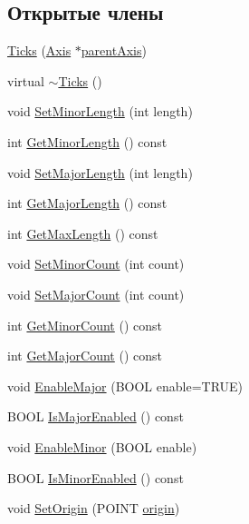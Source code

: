 \subsection*{Открытые члены}
\begin{DoxyCompactItemize}
\item 
\hyperlink{class_ticks_a48820608dd7a0bd504527deb457fc111}{Ticks} (\hyperlink{class_axis}{Axis} $\ast$\hyperlink{class_ticks_a1651670c18ed9ab64dc36f1a0f97f6c6}{parent\-Axis})
\item 
virtual \hyperlink{class_ticks_ab3a97a6266de2e1d089fbd85cbe5f5dd}{$\sim$\-Ticks} ()
\item 
void \hyperlink{class_ticks_a2fb7a8c3fe17f9a768014f9b7a6ab2e4}{Set\-Minor\-Length} (int length)
\item 
int \hyperlink{class_ticks_ad6394a3241855a227cfd869a8d676374}{Get\-Minor\-Length} () const 
\item 
void \hyperlink{class_ticks_acf24cc03f24d121992d8972e4dc703f9}{Set\-Major\-Length} (int length)
\item 
int \hyperlink{class_ticks_a1d03d0c25f828870ebfabfc536e9becb}{Get\-Major\-Length} () const 
\item 
int \hyperlink{class_ticks_ae0d548cd2a8dcc2feed13bb17800a038}{Get\-Max\-Length} () const 
\item 
void \hyperlink{class_ticks_a483d4d8347a6753c12960c95729821dc}{Set\-Minor\-Count} (int count)
\item 
void \hyperlink{class_ticks_ad79d9186b5b9f2dbc3c5ea8809d9a6c1}{Set\-Major\-Count} (int count)
\item 
int \hyperlink{class_ticks_aa63bc56cc72e854b3e1dcbd167f26cd5}{Get\-Minor\-Count} () const 
\item 
int \hyperlink{class_ticks_a2102769dbff638d61e068e0e60ddfc00}{Get\-Major\-Count} () const 
\item 
void \hyperlink{class_ticks_a1a00c0f9c5b36aed57838ebbc1d28b02}{Enable\-Major} (B\-O\-O\-L enable=T\-R\-U\-E)
\item 
B\-O\-O\-L \hyperlink{class_ticks_ada1063e3a34efd195c731c320268ee61}{Is\-Major\-Enabled} () const 
\item 
void \hyperlink{class_ticks_a45b4d99c8d61eea54c2d2a47c254c593}{Enable\-Minor} (B\-O\-O\-L enable)
\item 
B\-O\-O\-L \hyperlink{class_ticks_ab5f18bff2c5ca59338bae41f2eca8705}{Is\-Minor\-Enabled} () const 
\item 
void \hyperlink{class_ticks_a59a5f97b56ba8a5e66c7dd3537aa5372}{Set\-Origin} (P\-O\-I\-N\-T \hyperlink{class_ticks_a316c176b6108e99b7327efa4e62c9276}{origin})

\end{DoxyCompactItemize}
